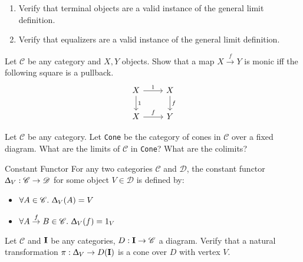 \def\pathToRoot{../../}

\usepackage{upgreek}



\author{Leonhard Staut}

\begin{exercise}
  \begin{enumerate}
  \item Verify that terminal objects are a valid instance of the general limit definition.
  \item Verify that equalizers are a valid instance of the general limit definition.
  \end{enumerate}
\end{exercise}

\begin{exercise}
  Let $\mathscr{C}$ be any category and $X, Y$ objects.
  Show that a map $X \overset{f}{\to} Y$ is monic iff the following square is a pullback.
  \[
    \begin{tikzcd}
      X \arrow{r}{1}  \arrow{d}{1}  & X \arrow{d}{f}    \\
      X \arrow{r}{f}                & Y                  
    \end{tikzcd}
  \]
\end{exercise}

\begin{exercise}
  Let $\mathscr{C}$ be any category. Let \texttt{Cone} be the category of cones
  in $\mathscr{C}$ over a fixed diagram.
  What are the limits of $\mathscr{C}$ in \texttt{Cone}? What are the colimits?
\end{exercise}

\begin{definition}
  {Constant Functor}
  For any two categories $\mathscr{C}$ and $\mathscr{D}$,
  the constant functor $\Updelta _ V : \mathscr{C} \to \mathscr{D} $ for some object $V \in \mathscr{D}$
  is defined by:
  \begin{itemize}
    \item $\forall A \in \mathscr{C}. \ \Updelta _ V (A) = V$
    \item $\forall A \overset{f}{\to} B \in \mathscr{C}. \ \Updelta _ V (f) = 1_V$
  \end{itemize}
  
\end{definition}

\begin{exercise}
  Let $\mathscr{C}$ and $\bf{I}$ be any categories, $D : \bf{I} \to \mathscr{C}$ a diagram.
  Verify that a natural transformation $\pi : \Updelta_V \to D(\bf{I})$ is a cone over $D$ with vertex $V$.
\end{exercise}

